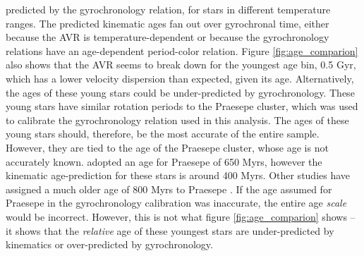 predicted by the \citet{angus2019} gyrochronology relation, for stars in
different temperature ranges.
The predicted kinematic ages fan out over gyrochronal time, either because the
AVR is temperature-dependent or because the gyrochronology relations have an
age-dependent period-color relation.
Figure \ref{fig:age_comparion} also shows that the AVR seems to break down for
the youngest age bin, 0.5 Gyr, which has a lower velocity dispersion than
expected, given its age.
Alternatively, the ages of these young stars could be under-predicted by
gyrochronology.
These young stars have similar rotation periods to the Praesepe cluster, which
was used to calibrate the gyrochronology relation used in this analysis.
The ages of these young stars should, therefore, be the most accurate of the
entire sample.
However, they are tied to the age of the Praesepe cluster, whose age is not
accurately known.
\citet{angus2019} adopted an age for Praesepe of 650 Myrs, however the
kinematic age-prediction for these stars is around 400 Myrs.
Other studies have assigned a much older age of 800 Myrs to Praesepe
\citep{brandt2015}.
If the age assumed for Praesepe in the \citet{angus2019} gyrochronology
calibration was inaccurate, the entire age {\it scale} would be incorrect.
However, this is not what figure \ref{fig:age_comparion} shows -- it shows
that the {\it relative} age of these youngest stars are under-predicted by
kinematics or over-predicted by gyrochronology.



